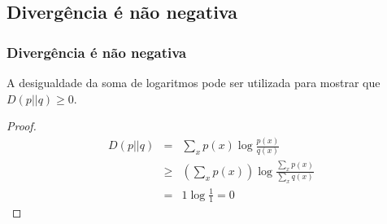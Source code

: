 \subsection{Divergência é não negativa}
\begin{frame}%
  \frametitle{Divergência é não negativa}
  A desigualdade da soma de logaritmos pode ser utilizada para mostrar que $D(p||q) \geq 0$.
  \begin{proof}
        \begin{eqnarray}
        D(p||q) &=& \sum_x p(x) \log \frac{p(x)}{q(x)} \nonumber \\
                &\geq& \left( \sum_x p(x) \right) \log \frac{\sum_x p(x)}{\sum_x q(x)} \nonumber \\
                &=& 1 \log \frac{1}{1} = 0
        \end{eqnarray}
  \end{proof}
\end{frame}

